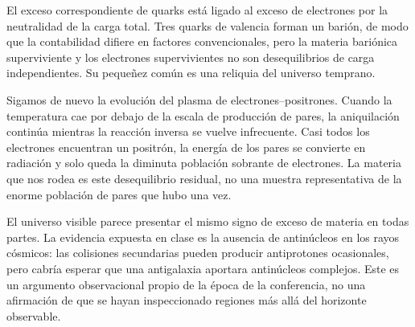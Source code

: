 El exceso correspondiente de quarks está ligado al exceso de electrones por la neutralidad de la carga total. Tres quarks de valencia forman un barión, de modo que la contabilidad difiere en factores convencionales, pero la materia bariónica superviviente y los electrones supervivientes no son desequilibrios de carga independientes. Su pequeñez común es una reliquia del universo temprano.

Sigamos de nuevo la evolución del plasma de electrones--positrones. Cuando la temperatura cae por debajo de la escala de producción de pares, la aniquilación continúa mientras la reacción inversa se vuelve infrecuente. Casi todos los electrones encuentran un positrón, la energía de los pares se convierte en radiación y solo queda la diminuta población sobrante de electrones. La materia que nos rodea es este desequilibrio residual, no una muestra representativa de la enorme población de pares que hubo una vez.

\begin{classroomqa}
\end{classroomqa}

El universo visible parece presentar el mismo signo de exceso de materia en todas partes. La evidencia expuesta en clase es la ausencia de antinúcleos en los rayos cósmicos: las colisiones secundarias pueden producir antiprotones ocasionales, pero cabría esperar que una antigalaxia aportara antinúcleos complejos. Este es un argumento observacional propio de la época de la conferencia, no una afirmación de que se hayan inspeccionado regiones más allá del horizonte observable.

\begin{classroomqa}
\end{classroomqa}

